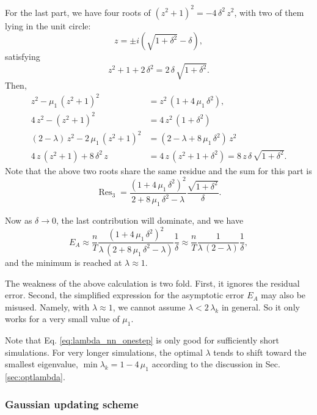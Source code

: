 \documentclass[reprint, floatfix]{revtex4-1}
\newcommand{\Err}{E}
\begin{document}
{For the last part,
we have four roots of
$(z^2 + 1)^2 = - 4 \, \delta^2 \, z^2$,
with two of them lying in the unit circle:
$$
z = \pm i \left( \sqrt{ 1 + \delta^2 } - \delta \right),
$$
satisfying
$$
z^2 + 1 + 2 \, \delta^2 = 2 \, \delta \, \sqrt{1 + \delta^2}.
$$
Then,
$$
\begin{aligned}
z^2 - \mu_1 \, \left( z^2 + 1 \right)^2
&= z^2 \, (1 + 4 \, \mu_1 \, \delta^2),
\\
4 \, z^2 - \left( z^2 + 1 \right)^2
&=
4 \, z^2 \, (1 + \delta^2)
\\
%
(2 - \lambda) \, z^2
- 2 \, \mu_1 \, \left( z^2 + 1 \right)^2
&=
\left(
  2 - \lambda + 8 \, \mu_1 \, \delta^2
\right) \, z^2
\\
%
4 \, z \, \left( z^2 + 1 \right)
+
8 \, \delta^2 \, z
&=
4 \, z \, (z^2 + 1 + \delta^2)
=
8 \, z \, \delta \, \sqrt{ 1 + \delta^2 }.
\end{aligned}
$$
Note that the above two roots share the same
residue and the sum for this part is
$$
\operatorname{Res}_3
=
\frac{ \left( 1 + 4 \, \mu_1 \, \delta^2 \right)^2 }
     {        2 + 8 \, \mu_1 \, \delta^2 - \lambda }
\frac{ \sqrt{ 1 + \delta^2 } }
     {        \delta         }.
$$

Now as $\delta \to 0$, the last contribution will dominate,
and we have
$$
\Err_A
\approx
\frac{ n } { T }
\frac{ (1 + 4 \, \mu_1 \, \delta^2)^2 }
{ \lambda \, (2 + 8 \, \mu_1 \, \delta^2 - \lambda) }
\frac{ 1 } { \delta }
\approx
\frac{ n } { T }
\frac{ 1 }
{ \lambda \, (2 - \lambda) }
\frac{ 1 } { \delta },
$$
and the minimum is reached at $\lambda \approx 1$.

The weakness of the above calculation is two fold.
%
First, it ignores the residual error.
%
Second, the simplified expression for the asymptotic error
$E_A$ may also be misused.
%
Namely, with $\lambda \approx 1$,
we cannot assume $\lambda < 2 \, \lambda_k$ in general.
%
So it only works for a very small value of $\mu_1$.
}



Note that Eq. \eqref{eq:lambda_nn_onestep} is only good
for sufficiently short simulations.
%
For very longer simulations,
the optimal $\lambda$ tends to shift
toward the smallest eigenvalue,
$\min \lambda_k = 1 - 4 \, \mu_1$
according to the discussion in Sec. \ref{sec:optlambda}.



\subsubsection{Gaussian updating scheme}
\end{document}
